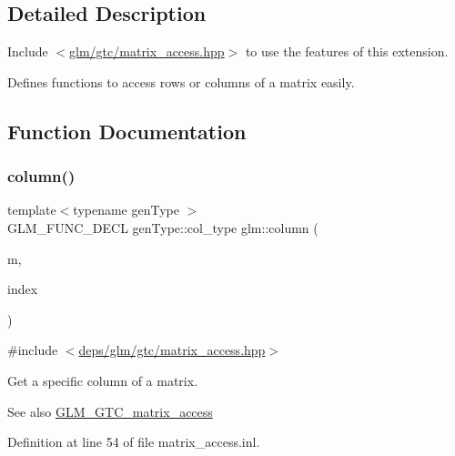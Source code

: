 \subsection{Detailed Description}
Include $<$\hyperlink{matrix__access_8hpp}{glm/gtc/matrix\+\_\+access.\+hpp}$>$ to use the features of this extension.

Defines functions to access rows or columns of a matrix easily. 

\subsection{Function Documentation}
\mbox{\label{group__gtc__matrix__access_ga96022eb0d3fae39d89fc7a954e59b374}} 
\subsubsection{\texorpdfstring{column()}{column()}\hspace{0.1cm}{\footnotesize\ttfamily [1/2]}}
{\footnotesize\ttfamily template$<$typename gen\+Type $>$ \\
G\+L\+M\+\_\+\+F\+U\+N\+C\+\_\+\+D\+E\+CL gen\+Type\+::col\+\_\+type glm\+::column (\begin{DoxyParamCaption}\item[{gen\+Type const \&}]{m,  }\item[{length\+\_\+t}]{index }\end{DoxyParamCaption})}



{\ttfamily \#include $<$\hyperlink{matrix__access_8hpp}{deps/glm/gtc/matrix\+\_\+access.\+hpp}$>$}

Get a specific column of a matrix. \begin{DoxySeeAlso}{See also}
\hyperlink{group__gtc__matrix__access}{G\+L\+M\+\_\+\+G\+T\+C\+\_\+matrix\+\_\+access} 
\end{DoxySeeAlso}


Definition at line 54 of file matrix\+\_\+access.\+inl.

\mbox{\label{group__gtc__matrix__access_ga9e757377523890e8b80c5843dbe4dd15}} 
